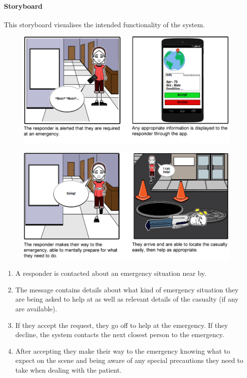 \documentclass{article}
\begin{document}
		\paragraph{Storyboard}
		This storyboard visualises the intended functionality of the system.
	\begin{figure}[H]
		\centering
		\includegraphics[width=1\textwidth]{"Iteration4/Storyboard - Iteration 3 - 1"}
	\end{figure}
	\begin{figure}[H]
		\centering
		\vspace{-20pt}
		\includegraphics[width=1\textwidth]{"Iteration4/Storyboard - Iteration 3 - 2"}
	\end{figure}
	\begin{enumerate}
  		\item A responder is contacted about an emergency situation near by.
  		\item The message contains details about what kind of emergency situation they are being asked to help at as well as relevant details of the casualty (if any are available).
  		\item If they accept the request, they go off to help at the emergency. If they decline, the system contacts the next closest person to the emergency.
  		\item After accepting they make their way to the emergency knowing what to expect on the scene and being aware of any special precautions they need to take when dealing with the patient.

	\end{enumerate}
\end{document}
